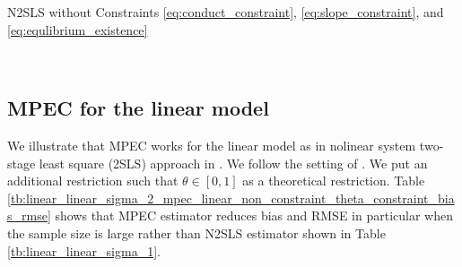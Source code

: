 \documentclass[11pt, a4paper]{article}
\begin{document}
\begin{landscape}{
\begin{table}[!htbp]
  \begin{center}
      \caption{N2SLS without Constraints \eqref{eq:conduct_constraint}, \eqref{eq:slope_constraint}, and \eqref{eq:equlibrium_existence}}
      \label{tb:loglinear_loglinear_sigma_1_simultaneous_non_constraint_non_constraint_bias_rmse} 
      \subfloat[N2SLS ($\sigma=0.5$)]{}\\
      \subfloat[N2SLS ($\sigma=1.0$)]{}
  \end{center}
  \footnotesize
\end{table} 
}
\end{landscape}

\subsection{MPEC for the linear model}\label{sec:linear_results}

We illustrate that MPEC works for the linear model as in nolinear system two-stage least square (2SLS) approach in \cite{matsumura2023resolving}. 
We follow the setting of \cite{matsumura2023resolving}.
We put an additional restriction such that $\theta\in[0,1]$ as a theoretical restriction. 
Table \ref{tb:linear_linear_sigma_2_mpec_linear_non_constraint_theta_constraint_bias_rmse} shows that MPEC estimator reduces bias and RMSE in particular when the sample size is large rather than N2SLS estimator shown in Table \ref{tb:linear_linear_sigma_1}.
\end{document}
